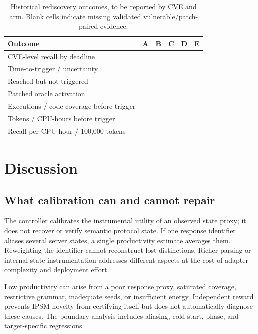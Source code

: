 \documentclass[final,5p,times,number]{elsarticle}
\newcommand{\missing}{\mbox{}}
\begin{document}
\begin{table}[!tp]
\centering\small
\caption{Historical rediscovery outcomes, to be reported by CVE and arm. Blank cells indicate missing validated vulnerable/patch-paired evidence.}
\label{tab:cveresults}
\begin{tabularx}{\textwidth}{Y *{5}{>{\centering\arraybackslash}X}}
\toprule
Outcome & A & B & C & D & E \\
\midrule
CVE-level recall by deadline & \missing & \missing & \missing & \missing & \missing \\
Time-to-trigger / uncertainty & \missing & \missing & \missing & \missing & \missing \\
Reached but not triggered & \missing & \missing & \missing & \missing & \missing \\
Patched oracle activation & \missing & \missing & \missing & \missing & \missing \\
Executions / code coverage before trigger & \missing & \missing & \missing & \missing & \missing \\
Tokens / CPU-hours before trigger & \missing & \missing & \missing & \missing & \missing \\
Recall per CPU-hour / 100,000 tokens & \missing & \missing & \missing & \missing & \missing \\
\bottomrule
\end{tabularx}
\end{table}

\section{Discussion}
\subsection{What calibration can and cannot repair}
The controller calibrates the instrumental utility of an observed state proxy; it does not recover or verify semantic protocol state. If one response identifier aliases several server states, a single productivity estimate averages them. Reweighting the identifier cannot reconstruct lost distinctions. Richer parsing or internal-state instrumentation addresses different aspects at the cost of adapter complexity and deployment effort.

Low productivity can arise from a poor response proxy, saturated coverage, restrictive grammar, inadequate seeds, or insufficient energy. Independent reward prevents IPSM novelty from certifying itself but does not automatically diagnose these causes. The boundary analysis includes aliasing, cold start, phase, and target-specific regressions.
\end{document}
